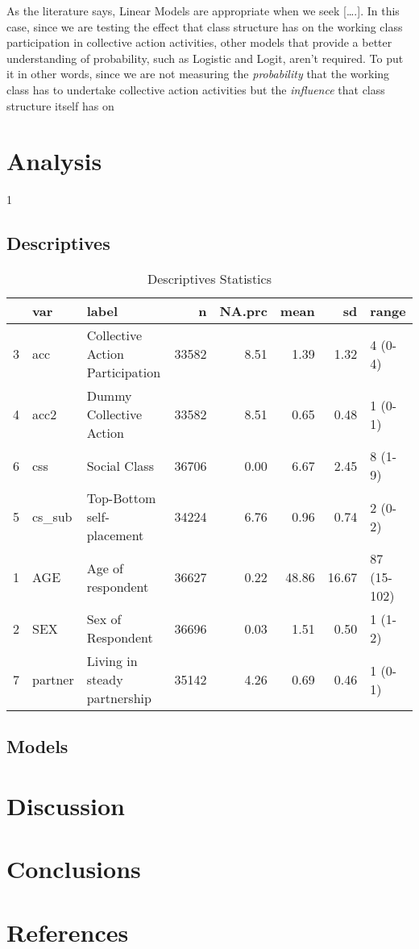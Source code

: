 \documentclass[
]{article}
\begin{document}
As the literature says, Linear Models are appropriate when we seek
{[}\ldots.{]}. In this case, since we are testing the effect that class
structure has on the working class participation in collective action
activities, other models that provide a better understanding of
probability, such as Logistic and Logit, aren't required. To put it in
other words, since we are not measuring the \emph{probability} that the
working class has to undertake collective action activities but the
\emph{influence} that class structure itself has on

\hypertarget{analysis}{%
\section{Analysis}\label{analysis}}

1

\hypertarget{descriptives}{%
\subsection{Descriptives}\label{descriptives}}

\begin{table}[ht]
\centering
\caption{Descriptives Statistics}
\begin{tabular}{rllrrrrl}
  \hline
 & var & label & n & NA.prc & mean & sd & range \\ 
  \hline
3 & acc & Collective Action Participation & 33582 & 8.51 & 1.39 & 1.32 & 4 (0-4) \\ 
  4 & acc2 & Dummy Collective Action & 33582 & 8.51 & 0.65 & 0.48 & 1 (0-1) \\ 
  6 & css & Social Class & 36706 & 0.00 & 6.67 & 2.45 & 8 (1-9) \\ 
  5 & cs\_sub & Top-Bottom self-placement & 34224 & 6.76 & 0.96 & 0.74 & 2 (0-2) \\ 
  1 & AGE & Age of respondent & 36627 & 0.22 & 48.86 & 16.67 & 87 (15-102) \\ 
  2 & SEX & Sex of Respondent & 36696 & 0.03 & 1.51 & 0.50 & 1 (1-2) \\ 
  7 & partner & Living in steady partnership & 35142 & 4.26 & 0.69 & 0.46 & 1 (0-1) \\ 
   \hline
\end{tabular}
\end{table}

\hypertarget{models}{%
\subsection{Models}\label{models}}

\hypertarget{discussion}{%
\section{Discussion}\label{discussion}}

\hypertarget{conclusions}{%
\section{Conclusions}\label{conclusions}}

\hypertarget{references}{%
\section{References}\label{references}}
\end{document}

